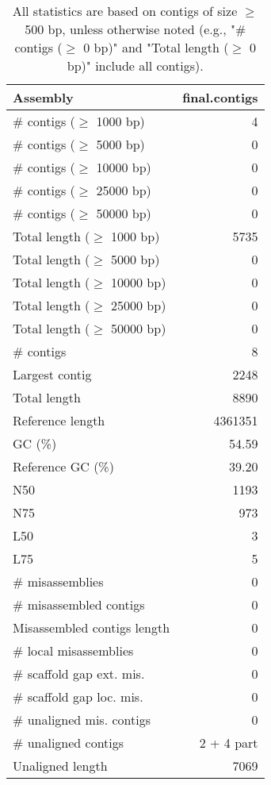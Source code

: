 \documentclass[12pt,a4paper]{article}
\begin{document}
\begin{table}[ht]
\begin{center}
\caption{All statistics are based on contigs of size $\geq$ 500 bp, unless otherwise noted (e.g., "\# contigs ($\geq$ 0 bp)" and "Total length ($\geq$ 0 bp)" include all contigs).}
\begin{tabular}{|l*{1}{|r}|}
\hline
Assembly & final.contigs \\ \hline
\# contigs ($\geq$ 1000 bp) & 4 \\ \hline
\# contigs ($\geq$ 5000 bp) & 0 \\ \hline
\# contigs ($\geq$ 10000 bp) & 0 \\ \hline
\# contigs ($\geq$ 25000 bp) & 0 \\ \hline
\# contigs ($\geq$ 50000 bp) & 0 \\ \hline
Total length ($\geq$ 1000 bp) & 5735 \\ \hline
Total length ($\geq$ 5000 bp) & 0 \\ \hline
Total length ($\geq$ 10000 bp) & 0 \\ \hline
Total length ($\geq$ 25000 bp) & 0 \\ \hline
Total length ($\geq$ 50000 bp) & 0 \\ \hline
\# contigs & 8 \\ \hline
Largest contig & 2248 \\ \hline
Total length & 8890 \\ \hline
Reference length & 4361351 \\ \hline
GC (\%) & 54.59 \\ \hline
Reference GC (\%) & 39.20 \\ \hline
N50 & 1193 \\ \hline
N75 & 973 \\ \hline
L50 & 3 \\ \hline
L75 & 5 \\ \hline
\# misassemblies & 0 \\ \hline
\# misassembled contigs & 0 \\ \hline
Misassembled contigs length & 0 \\ \hline
\# local misassemblies & 0 \\ \hline
\# scaffold gap ext. mis. & 0 \\ \hline
\# scaffold gap loc. mis. & 0 \\ \hline
\# unaligned mis. contigs & 0 \\ \hline
\# unaligned contigs & 2 + 4 part \\ \hline
Unaligned length & 7069 \\ \hline

\end{tabular}
\end{center}
\end{table}
\end{document}
